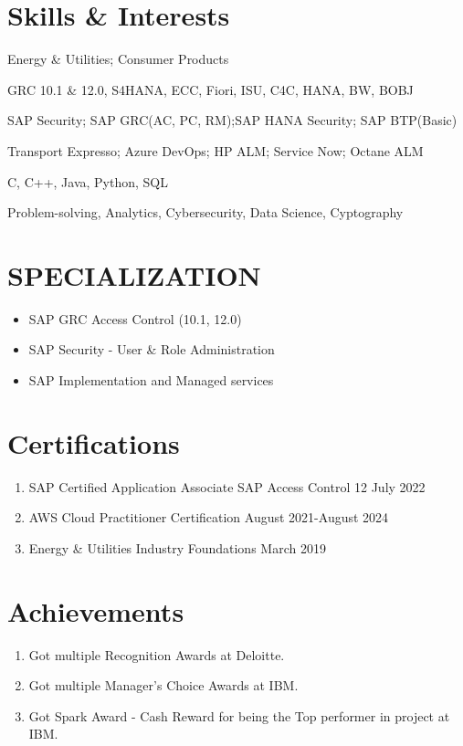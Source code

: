 \documentclass[10pt]{article}
\begin{document}
\section{Skills \& Interests}
\begin{description}[itemsep=0pt]
	\small
		\item[Industry Served:] Energy \& Utilities; Consumer Products
		\item[SAP Applications:] GRC 10.1 \& 12.0, S4HANA, ECC, Fiori, ISU, C4C, HANA, BW, BOBJ
		\item[Trainings:] SAP Security; SAP GRC(AC, PC, RM);SAP HANA Security; SAP BTP(Basic)
		\item[Tools used:] Transport Expresso; Azure DevOps; HP ALM; Service Now; Octane ALM
		\item[Language:] C, C++, Java, Python, SQL
		\item[Interests:] Problem-solving, Analytics, Cybersecurity, Data Science, Cyptography
\end{description}

\section{SPECIALIZATION}
\begin{itemize}
	\small
		\item SAP GRC Access Control (10.1, 12.0)
		\item SAP Security - User \& Role Administration
		\item SAP Implementation and Managed services
\end{itemize}

\section{Certifications}
\begin{enumerate}[label=\null, left=0pt..0pt, itemsep=0pt]
	\small
		\item SAP Certified Application Associate SAP Access Control 12 \hfill July 2022
		\item AWS Cloud Practitioner Certification \hfill August 2021-August 2024
		\item Energy \& Utilities Industry Foundations \hfill March 2019
\end{enumerate}

\section{Achievements}
\begin{enumerate}[label=\null, left=0pt..0pt, itemsep=0pt]
	\small
		\item Got multiple Recognition Awards at Deloitte.
		\item Got multiple Manager's Choice Awards at IBM.
		\item Got Spark Award - Cash Reward for being the Top performer in project at IBM.
\end{enumerate}
\end{document}

